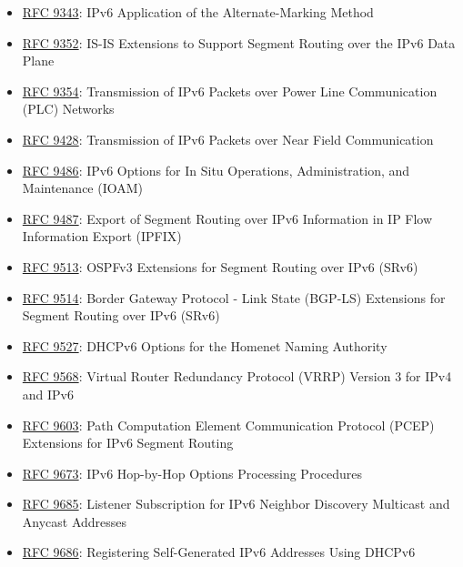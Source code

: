 \documentclass[
]{article}
\begin{document}
\begin{itemize}
  \href{https://www.rfc-editor.org/info/rfc9259}{RFC 9259}: Operations,
  Administration, and Maintenance (OAM) in Segment Routing over IPv6
  (SRv6)
\item
  \href{https://www.rfc-editor.org/info/rfc9343}{RFC 9343}: IPv6
  Application of the Alternate-Marking Method
\item
  \href{https://www.rfc-editor.org/info/rfc9352}{RFC 9352}: IS-IS
  Extensions to Support Segment Routing over the IPv6 Data Plane
\item
  \href{https://www.rfc-editor.org/info/rfc9354}{RFC 9354}: Transmission
  of IPv6 Packets over Power Line Communication (PLC) Networks
\item
  \href{https://www.rfc-editor.org/info/rfc9428}{RFC 9428}: Transmission
  of IPv6 Packets over Near Field Communication
\item
  \href{https://www.rfc-editor.org/info/rfc9486}{RFC 9486}: IPv6 Options
  for In Situ Operations, Administration, and Maintenance (IOAM)
\item
  \href{https://www.rfc-editor.org/info/rfc9487}{RFC 9487}: Export of
  Segment Routing over IPv6 Information in IP Flow Information Export
  (IPFIX)
\item
  \href{https://www.rfc-editor.org/info/rfc9513}{RFC 9513}: OSPFv3
  Extensions for Segment Routing over IPv6 (SRv6)
\item
  \href{https://www.rfc-editor.org/info/rfc9514}{RFC 9514}: Border
  Gateway Protocol - Link State (BGP-LS) Extensions for Segment Routing
  over IPv6 (SRv6)
\item
  \href{https://www.rfc-editor.org/info/rfc9527}{RFC 9527}: DHCPv6
  Options for the Homenet Naming Authority
\item
  \href{https://www.rfc-editor.org/info/rfc9568}{RFC 9568}: Virtual
  Router Redundancy Protocol (VRRP) Version 3 for IPv4 and IPv6
\item
  \href{https://www.rfc-editor.org/info/rfc9603}{RFC 9603}: Path
  Computation Element Communication Protocol (PCEP) Extensions for IPv6
  Segment Routing
\item
  \href{https://www.rfc-editor.org/info/rfc9673}{RFC 9673}: IPv6
  Hop-by-Hop Options Processing Procedures
\item
  \href{https://www.rfc-editor.org/info/rfc9685}{RFC 9685}: Listener
  Subscription for IPv6 Neighbor Discovery Multicast and Anycast
  Addresses
\item
  \href{https://www.rfc-editor.org/info/rfc9686}{RFC 9686}: Registering
  Self-Generated IPv6 Addresses Using DHCPv6

\end{itemize}
\end{document}
